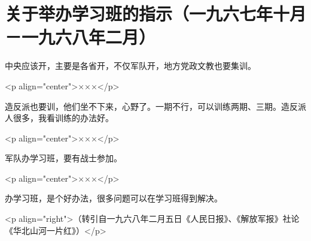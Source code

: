 \section[关于举办学习班的指示（一九六七年十月－一九六八年二月）]{关于举办学习班的指示（一九六七年十月－一九六八年二月）}


中央应该开，主要是各省开，不仅军队开，地方党政文教也要集训。

<p align="center">×××</p>

造反派也要训，他们坐不下来，心野了。一期不行，可以训练两期、三期。造反派人很多，我看训练的办法好。

<p align="center">×××</p>

军队办学习班，要有战士参加。

<p align="center">×××</p>

办学习班，是个好办法，很多问题可以在学习班得到解决。

<p align="right">（转引自一九六八年二月五日《人民日报》、《解放军报》社论《华北山河一片红》）</p>


